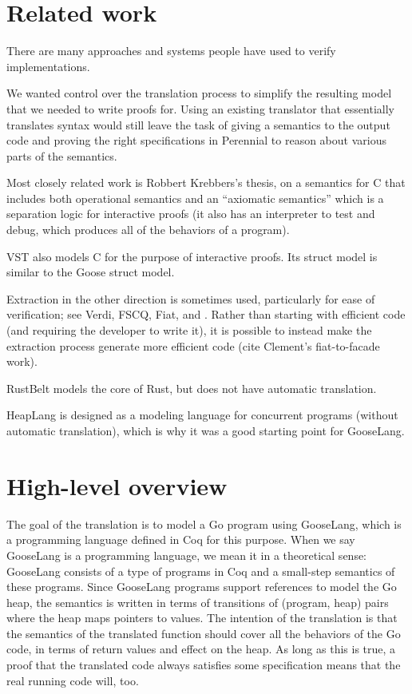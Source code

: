 \section{Related work}
\label{s:goose:rel-work}

There are many approaches and systems people have used to verify
implementations.

We wanted control over the translation process to simplify the resulting
model that we needed to write proofs for. Using an existing translator
that essentially translates syntax would still leave the task of giving
a semantics to the output code and proving the right specifications in
Perennial to reason about various parts of the semantics.

Most closely related work is Robbert Krebbers's thesis, on a semantics
for C that includes both operational semantics and an ``axiomatic
semantics'' which is a separation logic for interactive proofs (it also
has an interpreter to test and debug, which produces all of the
behaviors of a program).

VST also models C for the purpose of interactive proofs. Its struct model is
similar to the Goose struct model.

Extraction in the other direction is sometimes used, particularly for ease of
verification; see Verdi, FSCQ, Fiat, and \fstar. Rather than starting with efficient
code (and requiring the developer to write it), it is possible to instead make
the extraction process generate more efficient code (cite Clement's
fiat-to-facade work).

RustBelt models the core of Rust, but does not have automatic translation.

HeapLang is designed as a modeling language for concurrent programs (without
automatic translation), which is why it was a good starting point for GooseLang.

\section{High-level overview}

The goal of the translation is to model a Go program using GooseLang,
which is a programming language defined in Coq for this purpose. When we
say GooseLang is a programming language, we mean it in a theoretical
sense: GooseLang consists of a type of programs in Coq and a small-step
semantics of these programs. Since GooseLang programs support references
to model the Go heap, the semantics is written in terms of transitions
of (program, heap) pairs where the heap maps pointers to values. The
intention of the translation is that the semantics of the translated
function should cover all the behaviors of the Go code, in terms of
return values and effect on the heap. As long as this is true, a proof
that the translated code always satisfies some specification means that
the real running code will, too.

